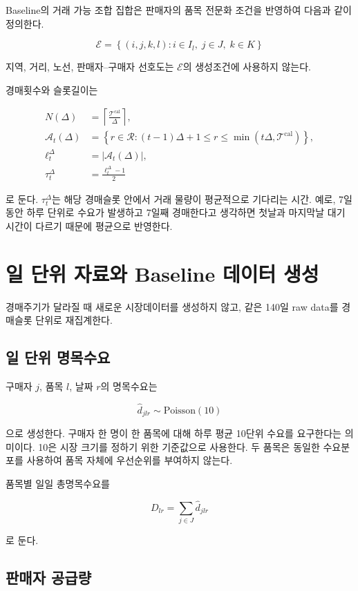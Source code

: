 \documentclass[11pt,a4paper]{article}
\newcommand{\Tcal}{\mathcal T^{\mathrm{cal}}}
\newcommand{\Rset}{\mathcal R}
\newcommand{\Aset}{\mathcal A}
\newcommand{\Eset}{\mathcal E}
\begin{document}
Baseline의 거래 가능 조합 집합은 판매자의 품목 전문화 조건을 반영하여 다음과 같이 정의한다.

\[
\Eset=
\left\{
(i,j,k,l):
i\in I_l,\;
j\in J,\;
k\in K
\right\}
\]

지역, 거리, 노선, 판매자--구매자 선호도는 $\Eset$의 생성조건에 사용하지 않는다.

경매횟수와 슬롯길이는

\begin{align}
N(\Delta)&=\left\lceil\frac{\Tcal}{\Delta}\right\rceil,\\
\Aset_t(\Delta)
&=
\left\{
r\in\Rset:(t-1)\Delta+1\le r\le \min(t\Delta,\Tcal)
\right\},\\
\ell_t^\Delta&=|\Aset_t(\Delta)|,\\
\tau_t^\Delta&=\frac{\ell_t^\Delta-1}{2}
\end{align}

로 둔다.
$\tau_t^\Delta$는 해당 경매슬롯 안에서 거래 물량이 평균적으로 기다리는 시간. 예로, 7일 동안 하루 단위로 수요가 발생하고 7일째 경매한다고 생각하면 첫날과 마지막날 대기 시간이 다르기 때문에 평균으로 반영한다.

\section{일 단위 자료와 Baseline 데이터 생성}

경매주기가 달라질 때 새로운 시장데이터를 생성하지 않고,
같은 140일 raw data를 경매슬롯 단위로 재집계한다.

\subsection{일 단위 명목수요}

구매자 $j$, 품목 $l$, 날짜 $r$의 명목수요는

\[
\hat d_{jlr}\sim \mathrm{Poisson}(10)
\]

으로 생성한다. 구매자 한 명이 한 품목에 대해 하루 평균 10단위 수요를 요구한다는 의미이다. 10은 시장 크기를 정하기 위한 기준값으로 사용한다.
두 품목은 동일한 수요분포를 사용하여 품목 자체에 우선순위를 부여하지 않는다.

품목별 일일 총명목수요를

\[
D_{lr}=\sum_{j\in J}\hat d_{jlr}
\]

로 둔다.

\subsection{판매자 공급량}
\end{document}
